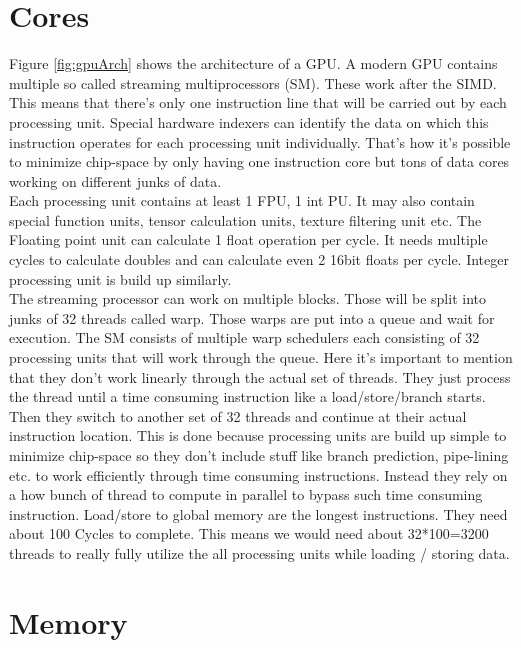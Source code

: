 \section{Cores}
Figure \ref{fig:gpuArch} shows the architecture of a GPU. A modern GPU contains multiple so called streaming multiprocessors (SM). These work after the \gls{SIMD}. This means that there's only one instruction line that will be carried out by each processing unit. Special hardware indexers can identify the data on which this instruction operates for each processing unit individually. That's how it's possible to minimize chip-space by only having one instruction core but tons of data cores working on different junks of data.\\
Each processing unit contains at least 1 FPU, 1 int PU. It may also contain special function units, tensor calculation units, texture filtering unit etc. The Floating point unit can calculate 1 float operation per cycle. It needs multiple cycles to calculate doubles and can calculate even 2 16bit floats per cycle. Integer processing unit is build up similarly.\\
The streaming processor can work on multiple blocks. Those will be split into junks of 32 threads called warp. Those warps are put into a queue and wait for execution. The SM consists of multiple warp schedulers each consisting of 32 processing units that will work through the queue. Here it's important to mention that they don't work linearly through the actual set of threads. They just process the thread until a time consuming instruction like a load/store/branch starts. Then they switch to another set of 32 threads and continue at their actual instruction location. This is done because processing units are build up simple to minimize chip-space so they don't include stuff like branch prediction, pipe-lining etc. to work efficiently through time consuming instructions. Instead they rely on a how bunch of thread to compute in parallel to bypass such time consuming instruction.
Load/store to global memory are the longest instructions. They need about 100 Cycles to complete. This means we would need about 32*100=3200 threads to really fully utilize the all processing units while loading / storing data. 

\section{Memory}

